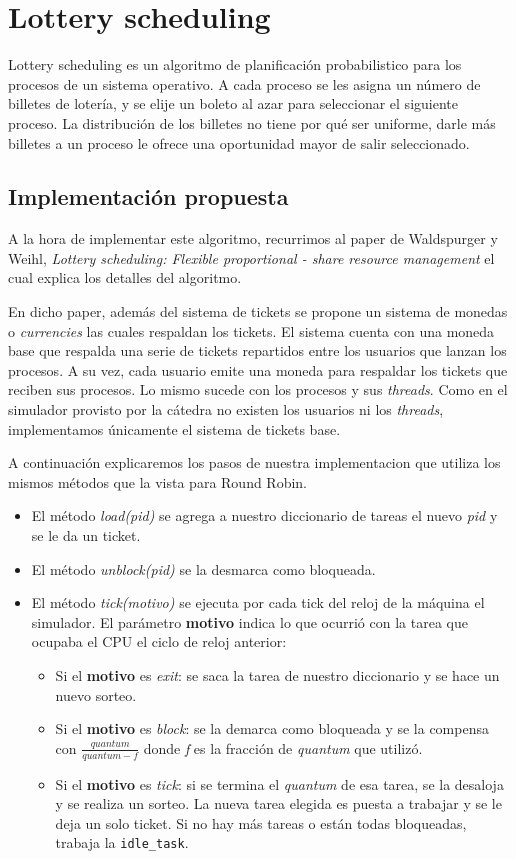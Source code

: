 \section{Lottery scheduling}
Lottery scheduling es un algoritmo de planificaci\'on probabilistico para los procesos de un sistema operativo. A cada proceso se les asigna un n\'umero de billetes de loter\'ia, y se elije un boleto al azar para seleccionar el siguiente proceso. La distribución de los billetes no tiene por qu\'e ser uniforme, darle más billetes a un proceso le ofrece una oportunidad mayor de salir seleccionado.

\subsection{Implementaci\'on propuesta}
A la hora de implementar este algoritmo, recurrimos al paper de Waldspurger y Weihl, \textit{Lottery scheduling: Flexible proportional - share resource management} el cual explica los detalles del algoritmo. 

En dicho paper, adem\'as del sistema de tickets se propone un sistema de monedas o \textit{currencies} las cuales respaldan los tickets. El sistema cuenta con una moneda base que respalda una serie de tickets repartidos entre los usuarios que lanzan los procesos. A su vez, cada usuario emite una moneda para respaldar los tickets que reciben sus procesos. Lo mismo sucede con los procesos y sus \textit{threads}. Como en el simulador provisto por la c\'atedra no existen los usuarios ni los \textit{threads}, implementamos \'unicamente el sistema de tickets base.

A continuaci\'on explicaremos los pasos de nuestra implementacion que utiliza los mismos m\'etodos que la vista para Round Robin.

\begin{itemize}
	\item El método \textit{load(pid)} se agrega a nuestro diccionario de tareas el nuevo \textit{pid} y se le da un ticket.
	\item El método \textit{unblock(pid)} se la desmarca como bloqueada.
	\item El método \textit{tick(motivo)} se ejecuta por cada tick del reloj de la máquina el simulador. El parámetro \textbf{motivo} indica lo que ocurrió con la tarea que ocupaba el CPU el ciclo de reloj anterior:
	
	\begin{itemize}
		\item Si el \textbf{motivo} es \textit{exit}: se saca la tarea de nuestro diccionario y se hace un nuevo sorteo.
		\item Si el \textbf{motivo} es \textit{block}: se la demarca como bloqueada y se la compensa con $\frac{quantum}{quantum - f}$ donde \textit{f} es la fracci\'on de \textit{quantum} que utiliz\'o.
		\item Si el \textbf{motivo} es \textit{tick}: si se termina el \textit{quantum} de esa tarea, se la desaloja y se realiza un sorteo. La nueva tarea elegida es puesta a trabajar y se le deja un solo ticket. Si no hay m\'as tareas o est\'an todas bloqueadas, trabaja la \verb|idle_task|.
	\end{itemize}
\end{itemize}